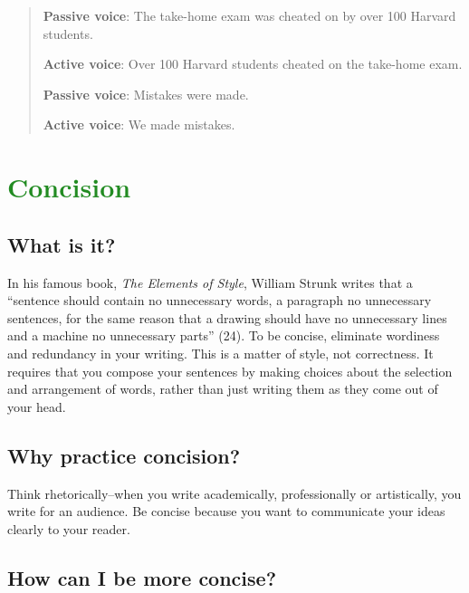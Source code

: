 \documentclass[12pt, hidelinks]{article} %
\begin{document}
\begin{quote}
\textbf{Passive voice}: The take-home exam was cheated on by over 100 Harvard students.

\textbf{Active voice}: Over 100 Harvard students cheated on the take-home exam.

\textbf{Passive voice}: Mistakes were made.

\textbf{Active voice}: We made mistakes.

\end{quote}

\section{\textcolor{ForestGreen}{Concision}}
 
\subsection{What is it?}
 
In his famous book, \emph{The Elements of Style}, William Strunk writes that a ``sentence should contain no unnecessary words, a paragraph no unnecessary sentences, for the same reason that a drawing should have no unnecessary lines and a machine no unnecessary parts'' (24). To be concise, eliminate wordiness and redundancy in your writing. This is a matter of style, not correctness. It requires that you compose your sentences by making choices about the selection and arrangement of words, rather than just writing them as they come out of your head.
 
\subsection{Why practice concision?}
 
Think rhetorically--when you write academically, professionally or artistically, you write for an audience. Be concise because you want to communicate your ideas clearly to your reader.
 
\subsection{How can I be more concise?}
 
\end{document}
